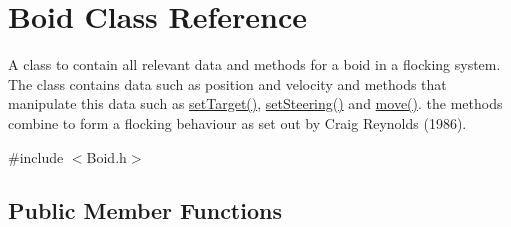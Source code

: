 \hypertarget{classBoid}{
\section{Boid Class Reference}
\label{classBoid}
}


A class to contain all relevant data and methods for a boid in a flocking system. The class contains data such as position and velocity and methods that manipulate this data such as \hyperlink{classBoid_aa1144dbf8050c06e5a89db5f84411dd6}{setTarget()}, \hyperlink{classBoid_aa2b619d85612051c88b2e7cc67ac0115}{setSteering()} and \hyperlink{classBoid_ad84ed9152d035b542921547f289024eb}{move()}. the methods combine to form a flocking behaviour as set out by Craig Reynolds (1986).  


{\ttfamily \#include $<$Boid.h$>$}\subsection*{Public Member Functions}

